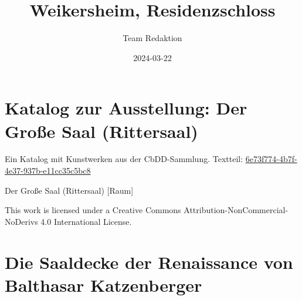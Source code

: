\documentclass[
  letterpaper,
]{book}
\title{Weikersheim, Residenzschloss}
\author{Team Redaktion}
\date{2024-03-22}
\renewcommand*\contentsname{Table of contents}
\newcommand\contentsname{Table of contents}
\begin{document}
\frontmatter
\maketitle

\renewcommand*\contentsname{Table of contents}
{
\setcounter{tocdepth}{2}
\tableofcontents
}

\mainmatter
{}

\chapter{Katalog zur Ausstellung: Der Große Saal
(Rittersaal)}\label{katalog-zur-ausstellung-der-grouxdfe-saal-rittersaal}

Ein Katalog mit Kunstwerken aus der CbDD-Sammlung. Textteil:
\href{https://www.deckenmalerei.eu/6e73f774-4b7f-4e37-937b-e11cc35c5bc8}{6e73f774-4b7f-4e37-937b-e11cc35c5bc8}

Der Große Saal (Rittersaal) {[}Raum{]}

This work is licensed under a Creative Commons
Attribution-NonCommercial-NoDerivs 4.0 International License.


\chapter{Die Saaldecke der Renaissance von Balthasar
Katzenberger}\label{die-saaldecke-der-renaissance-von-balthasar-katzenberger}
\end{document}
